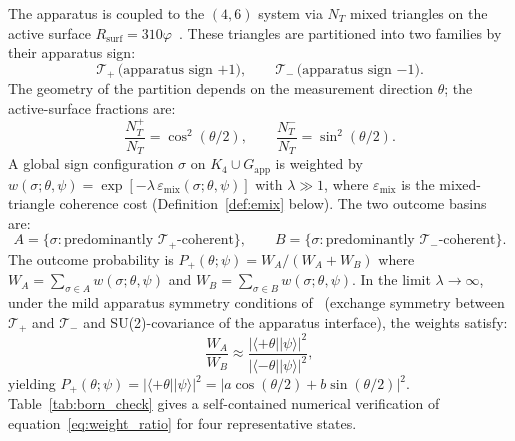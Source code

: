 \documentclass[11pt,a4paper]{article}
\theoremstyle{definition}
\newcommand{\Rsurf}{R_{\mathrm{surf}}}
\newcommand{\vp}{\varphi}
\newcommand{\Kfour}{K_4}
\newcommand{\emix}{\varepsilon_{\mathrm{mix}}}
\newcommand{\Tplus}{\mathcal{T}_+}
\newcommand{\Tminus}{\mathcal{T}_-}
\newcommand{\pket}[1]{|#1\rangle}
\newcommand{\pbra}[1]{\langle#1|}
\begin{document}
The apparatus is coupled to the $(4,6)$ system via $N_T$ mixed triangles on the active surface $\Rsurf = 310\vp$~\cite{Effective_Sigma_PDL_2026}. These triangles are partitioned into two families by their apparatus sign:
\begin{equation}
\Tplus\,\text{(apparatus sign $+1$)}, \qquad \Tminus\,\text{(apparatus sign $-1$)}.
\label{eq:partition}
\end{equation}
The geometry of the partition depends on the measurement direction $\theta$; the active-surface fractions are:
\begin{equation}
\frac{N_T^+}{N_T} = \cos^2(\theta/2), \qquad \frac{N_T^-}{N_T} = \sin^2(\theta/2).
\label{eq:fractions}
\end{equation}
A global sign configuration $\sigma$ on $\Kfour \cup G_{\mathrm{app}}$ is weighted by $w(\sigma;\theta,\psi) = \exp[-\lambda\,\emix(\sigma;\theta,\psi)]$ with $\lambda \gg 1$, where $\emix$ is the mixed-triangle coherence cost (Definition~\ref{def:emix} below). The two outcome basins are:
\begin{equation}
A = \{\sigma : \text{predominantly $\Tplus$-coherent}\}, \qquad B = \{\sigma : \text{predominantly $\Tminus$-coherent}\}.
\label{eq:basins}
\end{equation}
The outcome probability is $P_+(\theta;\psi) = W_A/(W_A + W_B)$ where $W_A = \sum_{\sigma \in A} w(\sigma;\theta,\psi)$ and $W_B = \sum_{\sigma \in B} w(\sigma;\theta,\psi)$. In the limit $\lambda \to \infty$, under the mild apparatus symmetry conditions of~\cite{Born_PDL_2026} (exchange symmetry between $\Tplus$ and $\Tminus$ and SU(2)-covariance of the apparatus interface), the weights satisfy:
\begin{equation}
\frac{W_A}{W_B} \approx \frac{|\pbra{+\theta}\pket{\psi}|^2}{|\pbra{-\theta}\pket{\psi}|^2},
\label{eq:weight_ratio}
\end{equation}
yielding $P_+(\theta;\psi) = |\pbra{+\theta}\pket{\psi}|^2 = |a\cos(\theta/2) + b\sin(\theta/2)|^2$. Table~\ref{tab:born_check} gives a self-contained numerical verification of equation~\eqref{eq:weight_ratio} for four representative states.
\end{document}
